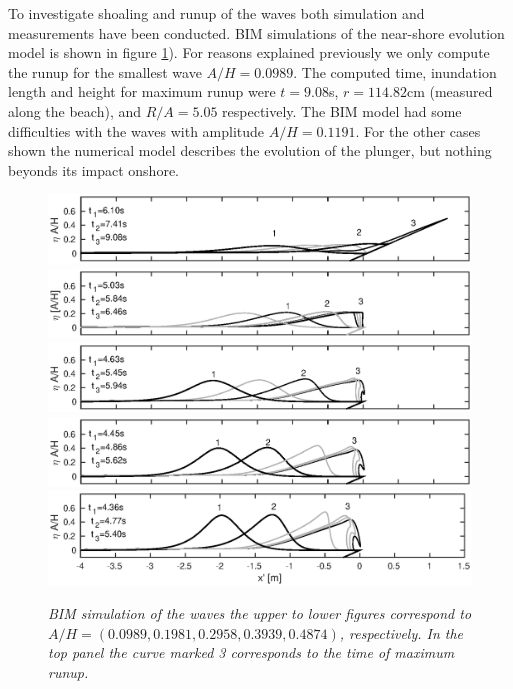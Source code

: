 \documentclass[review]{elsarticle}
\begin{document}
To investigate shoaling and runup of the waves 
both simulation and measurements have been conducted. 
BIM simulations of the near-shore evolution model is shown in figure \ref{fig:BIM}).
For reasons explained previously we only compute the runup for the 
smallest wave $A/H=0.0989$. The computed time, inundation length and height for 
maximum runup  
were $t=9.08$s, $r=114.82$cm (measured along the beach), and $R/A=5.05$ 
respectively. The BIM model had some difficulties with the waves with amplitude $A/H=0.1191$. For the other cases shown the numerical
model describes the evolution of the plunger, but nothing beyonds its impact onshore.  
\begin{figure}[]
\centering 
\includegraphics[width=\textwidth]{./Figures/BIM_s/case10.eps}
\includegraphics[width=\textwidth]{./Figures/BIM_s/case20.eps}
\includegraphics[width=\textwidth]{./Figures/BIM_s/case30.eps}
\includegraphics[width=\textwidth]{./Figures/BIM_s/case40.eps}
\includegraphics[width=1.015\textwidth]{./Figures/BIM_s/case50.eps}
\caption{\textit{BIM simulation of the waves the upper to lower figures correspond to $A/H=(0.0989, 0.1981, 0.2958, 0.3939, 0.4874)$, respectively. In the top panel the curve marked 3 corresponds to the time of maximum runup.}}
\label{fig:BIM}
\end{figure}
\end{document}

